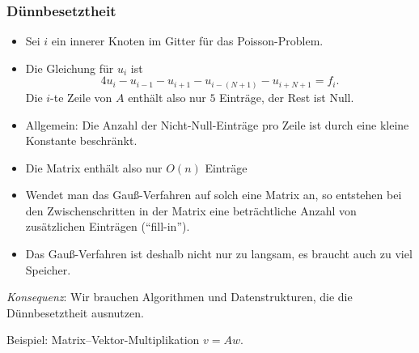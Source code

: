 \subsubsection{Dünnbesetztheit}
\begin{itemize}
	\item Sei $i$ ein innerer Knoten im Gitter für das Poisson-Problem.
	\item Die Gleichung für $u_i$ ist \begin{equation*}
					4u_i-u_{i-1}-u_{i+1}-u_{i-(N+1)}-u_{i+N+1}=f_i.
				\end{equation*}
		Die $i$-te Zeile von $A$ enthält also nur $5$ Einträge, der Rest ist Null.
	\item Allgemein: Die Anzahl der Nicht-Null-Einträge pro Zeile ist durch eine kleine Konstante beschränkt.
	\item Die Matrix enthält also nur $O(n)$ Einträge
	\item Wendet man das Gauß-Verfahren auf solch eine Matrix an, so entstehen bei den Zwischenschritten in der Matrix eine beträchtliche Anzahl von zusätzlichen Einträgen ("`fill-in"').
	\item Das Gauß-Verfahren ist deshalb nicht nur zu langsam, es braucht auch zu viel Speicher.
\end{itemize}

\bigskip

\emph{Konsequenz}: Wir brauchen Algorithmen und Datenstrukturen, die die Dünnbesetztheit ausnutzen.

\medskip Beispiel: Matrix--Vektor-Multiplikation $v = Aw$.

